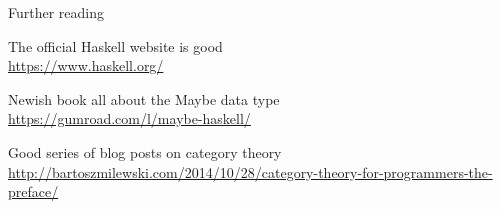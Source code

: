 \documentclass[xcolor={table}]{beamer}
\begin{document}
\begin{frame}{}{}

{\Large Further reading}

The official Haskell website is good \\
\url{https://www.haskell.org/}
\bigskip

Newish book all about the Maybe data type\\
\url{https://gumroad.com/l/maybe-haskell/}
\bigskip

Good series of blog posts on category theory\\
\url{ http://bartoszmilewski.com/2014/10/28/category-theory-for-programmers-the-preface/}

\end{frame}
\end{document}

